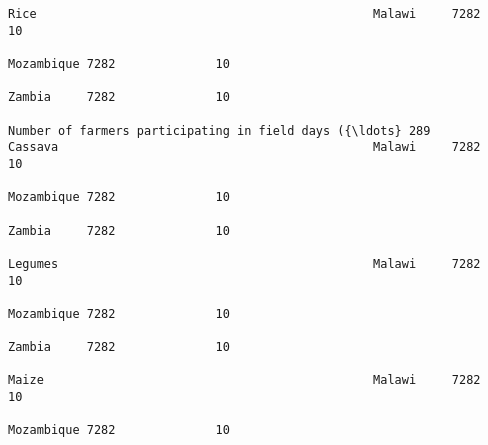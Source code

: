\documentclass[11pt]{article}
\begin{document}
\begin{Verbatim}[commandchars=\\\{\}]
                                                                                                                                                              Rice                                               Malawi     7282              10  
                                                                                                                                                                                                                 Mozambique 7282              10  
                                                                                                                                                                                                                 Zambia     7282              10  
                                                                         Number of farmers participating in field days ({\ldots} 289                               Cassava                                            Malawi     7282              10  
                                                                                                                                                                                                                 Mozambique 7282              10  
                                                                                                                                                                                                                 Zambia     7282              10  
                                                                                                                                                              Legumes                                            Malawi     7282              10  
                                                                                                                                                                                                                 Mozambique 7282              10  
                                                                                                                                                                                                                 Zambia     7282              10  
                                                                                                                                                              Maize                                              Malawi     7282              10  
                                                                                                                                                                                                                 Mozambique 7282              10  

\end{Verbatim}
\end{document}
